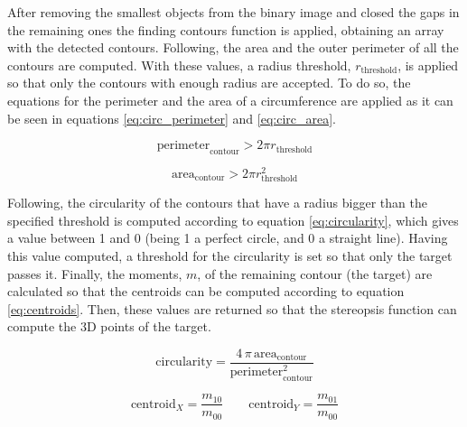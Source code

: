 After removing the smallest objects from the binary image and closed the gaps in the remaining ones the finding contours function is applied, obtaining an array with the detected contours. Following, the area and the outer perimeter of all the contours are computed. With these values, a radius threshold, $r_\mathrm{threshold}$, is applied so that only the contours with enough radius are accepted. To do so, the equations for the perimeter and the area of a circumference are applied as it can be seen in equations \ref{eq:circ_perimeter} and \ref{eq:circ_area}.

\begin{equation}
\mathrm{perimeter}_\mathrm{contour} > 2 \pi r_\mathrm{threshold}
\label{eq:circ_perimeter}
\end{equation}

\begin{equation}
\mathrm{area}_\mathrm{contour} > 2 \pi r_\mathrm{threshold}^{2}
\label{eq:circ_area}
\end{equation}

Following, the circularity of the contours that have a radius bigger than the specified threshold is computed according to equation \ref{eq:circularity}, which gives a value between 1 and 0 (being 1 a perfect circle, and 0 a straight line). Having this value computed, a threshold for the circularity is set so that only the target passes it. Finally, the moments, $m$, of the remaining contour (the target) are calculated so that the centroids can be computed according to equation \ref{eq:centroids}. Then, these values are returned so that the stereopsis function can compute the 3D points of the target.

\begin{equation}
\mathrm{circularity} = \frac{4 \, \pi \, \mathrm{area}_\mathrm{contour}}{\mathrm{perimeter}_\mathrm{contour}^{2}}
\label{eq:circularity}
\end{equation}

\begin{equation}
\mathrm{centroid}_{X} = \frac{m_{10}}{m_{00}} \qquad \mathrm{centroid}_{Y}=\frac{m_{01}}{m_{00}}
\label{eq:centroids}
\end{equation}

